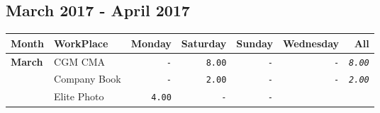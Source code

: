 \documentclass[11pt,A4paper,]{article}
\begin{document}
\clearpage

\subsection{March 2017 - April 2017}\label{march-2017---april-2017}

\begin{longtable}[]{@{}llrrrrr@{}}
\toprule
Month & WorkPlace & Monday & Saturday & Sunday & Wednesday &
All\tabularnewline
\midrule
\endhead
\textbf{March} & CGM CMA & \texttt{-} & \texttt{8.00} & \texttt{-} &
\texttt{-} & \emph{\texttt{8.00}}\tabularnewline
\begin{minipage}[t]{0.14\columnwidth}\raggedright\strut
\strut
\end{minipage} & \begin{minipage}[t]{0.14\columnwidth}\raggedright\strut
Company Book\strut
\end{minipage} & \begin{minipage}[t]{0.14\columnwidth}\raggedleft\strut
\texttt{-}\strut
\end{minipage} & \begin{minipage}[t]{0.14\columnwidth}\raggedleft\strut
\texttt{2.00}\strut
\end{minipage} & \begin{minipage}[t]{0.14\columnwidth}\raggedleft\strut
\texttt{-}\strut
\end{minipage} & \begin{minipage}[t]{0.14\columnwidth}\raggedleft\strut
\texttt{-}\strut
\end{minipage} & \begin{minipage}[t]{0.14\columnwidth}\raggedleft\strut
\emph{\texttt{2.00}}\strut
\end{minipage}\tabularnewline
\begin{minipage}[t]{0.14\columnwidth}\raggedright\strut
\strut
\end{minipage} & \begin{minipage}[t]{0.14\columnwidth}\raggedright\strut
Elite Photo\strut
\end{minipage} & \begin{minipage}[t]{0.14\columnwidth}\raggedleft\strut
\texttt{4.00}\strut
\end{minipage} & \begin{minipage}[t]{0.14\columnwidth}\raggedleft\strut
\texttt{-}\strut
\end{minipage} & \begin{minipage}[t]{0.14\columnwidth}\raggedleft\strut
\texttt{-}\strut

\end{minipage}
\end{longtable}
\end{document}

